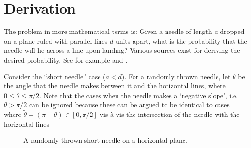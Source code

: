 \documentclass[11pt]{article}
\begin{document}
\section{Derivation}

The problem in more mathematical terms is: Given a needle of length \(a\) dropped on a plane ruled with parallel lines \(d\) units apart, what is the probability that the needle will lie across a line upon landing?
Various sources exist for deriving the desired probability. 
See for example \cite{mantel1953extension} and \cite{duncan1967variation}.

Consider the ``short needle'' case (\(a < d\)). For a randomly thrown needle, let \(\theta\) be the angle that the needle makes between it and the horizontal lines, where \(0\leq \theta \leq \pi/2\). 
Note that the cases when the needle makes a `negative slope', i.e.~\(\theta > \pi/2\) can be ignored because these can be argued to be identical to cases where \(\tilde\theta = (\pi -\theta) \in [0,\pi/2]\) vis-à-vis the intersection of the needle with the horizontal lines.


\usetikzlibrary{quotes,angles}
\begin{figure}[h]
\centering
{}
\caption{A randomly thrown short needle on a horizontal plane.}
\label{fig:buffon2}
\end{figure}
\end{document}
